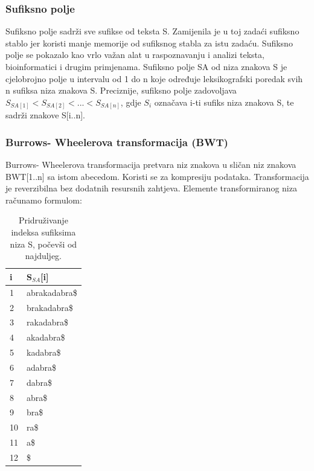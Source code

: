 \documentclass[a4paper,12pt]{article}
\begin{document}
\subsubsection{Sufiksno polje}
Sufiksno polje sadrži sve sufikse od teksta S. Zamijenila je u toj zadaći sufiksno stablo jer koristi manje memorije od sufiksnog stabla za istu zadaću. Sufiksno polje se pokazalo kao vrlo važan alat u raspoznavanju i analizi teksta, bioinformatici i drugim primjenama. 
Sufiksno polje SA od niza znakova S je cjelobrojno polje u intervalu od 1 do n koje određuje leksikografski poredak svih n sufiksa niza znakova S. Preciznije, sufiksno polje zadovoljava $ S_{SA[1]} < S_{SA[2]} < ... < S_{SA[n]}$, gdje $ S_i $ označava i-ti sufiks niza znakova S, te sadrži znakove S[i..n].
 
\subsubsection{Burrows- Wheelerova transformacija (BWT)}
\label{BWT_defincija}
Burrows- Wheelerova transformacija pretvara niz znakova u sličan niz znakova BWT[1..n] sa istom abecedom. Koristi se za kompresiju podataka. Transformacija je reverzibilna bez dodatnih resursnih zahtjeva. Elemente transformiranog niza računamo formulom:

 
\begin{table}
	\caption{Pridruživanje indeksa sufiksima niza S, počevši od najduljeg.}
	\label{tablePrimjer1}
	\begin{center}
		\begin{tabular}{ll}
			\toprule
			i & S$_{SA}$[i] \\
			\midrule
			1 & abrakadabra\$ \\
			2 & brakadabra\$ \\
			3 & rakadabra\$ \\
			4 & akadabra\$ \\
			5 & kadabra\$ \\
			6 & adabra\$ \\
			7 & dabra\$ \\
			8 & abra\$ \\
			9 & bra\$ \\
			10 & ra\$ \\
			11 & a\$ \\
			12 & \$ \\
			\bottomrule
		\end{tabular}
	\end{center}
\end{table}
\end{document}
